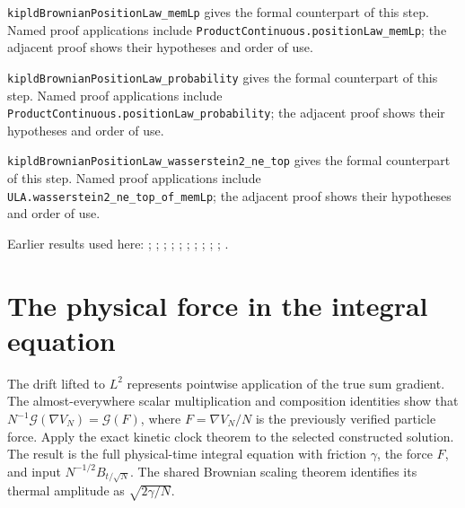 \documentclass[11pt,a4paper]{article}
\begin{document}
\begin{leanbox}
\texttt{kipld\allowbreak{}Brownian\allowbreak{}Position\allowbreak{}Law\_\allowbreak{}mem\allowbreak{}Lp} gives the formal counterpart of this step. Named proof applications include \texttt{Product\allowbreak{}Continuous.\allowbreak{}position\allowbreak{}Law\_\allowbreak{}mem\allowbreak{}Lp}; the adjacent proof shows their hypotheses and order of use.




\texttt{kipld\allowbreak{}Brownian\allowbreak{}Position\allowbreak{}Law\_\allowbreak{}probability} gives the formal counterpart of this step. Named proof applications include \texttt{Product\allowbreak{}Continuous.\allowbreak{}position\allowbreak{}Law\_\allowbreak{}probability}; the adjacent proof shows their hypotheses and order of use.




\texttt{kipld\allowbreak{}Brownian\allowbreak{}Position\allowbreak{}Law\_\allowbreak{}wasserstein2\_\allowbreak{}ne\_\allowbreak{}top} gives the formal counterpart of this step. Named proof applications include \texttt{ULA.\allowbreak{}wasserstein2\_\allowbreak{}ne\_\allowbreak{}top\_\allowbreak{}of\_\allowbreak{}mem\allowbreak{}Lp}; the adjacent proof shows their hypotheses and order of use.
\end{leanbox}


Earlier results used here: \cite[Section~3.17.3]{LangevinLean2026ULASC}; \cite[Section~3.17.4]{LangevinLean2026ULASC}; \cite[Section~3.21.2]{LangevinLean2026ULASC}; \cite[Section~3.26.15]{LangevinLean2026ULASC}; \cite[Section~3.1.1]{LangevinLean2026IPLA}; \cite[Section~3.1.3]{LangevinLean2026IPLA}; \cite[Section~3.1.4]{LangevinLean2026IPLA}; \cite[Section~3.3.2]{LangevinLean2026IPLA}; \cite[Section~3.5.1]{LangevinLean2026IPLA}; \cite[Section~3.19.1]{LangevinLean2026Kinetic}; \cite[Section~3.58.4]{LangevinLean2026Kinetic}.

\section{\texorpdfstring{The physical force in the integral equation}{The physical force in the integral equation}}


The drift lifted to \(L^{2}\) represents pointwise application of the true sum gradient. The almost-everywhere scalar multiplication and composition identities show that \(N^{-1}\mathcal G(\nabla V_N)=\mathcal G(F)\), where \(F=\nabla V_N/N\) is the previously verified particle force. Apply the exact kinetic clock theorem to the selected constructed solution. The result is the full physical-time integral equation with friction \(\gamma\), the force \(F\), and input \(N^{-1/2}B_{t/\sqrt N}\). The shared Brownian scaling theorem identifies its thermal amplitude as \(\sqrt{2\gamma/N}\).
\end{document}
